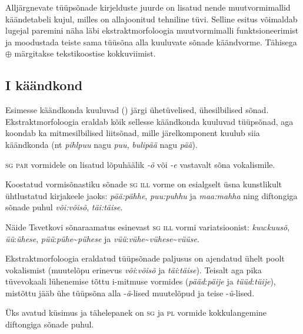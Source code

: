 \documentclass[12pt,a4paper]{article}
\newcommand{\vadja}[1]{\textit{#1}}
\newcommand{\msd}[1]{\textsc{#1}}
\begin{document}

Alljärgnevate tüüpsõnade kirjelduste juurde on lisatud nende muutvormimallid käände\-tabeli kujul, milles on alla\-joonitud tehniline tüvi. Selline esitus võimaldab lugejal paremini näha läbi ekstrakt\-morfoloogia muutvormimalli funktsioneerimist ja moodustada teiste sama tüüsõna alla kuuluvate sõnade käändvorme. Tähisega $\oplus$ märgitakse teksti\-koostise kokku\-viimist.

\subsection{\RN{1} käändkond}

Esimesse käändkonda kuuluvad (\cite[40]{ariste_grammar_1968}) järgi ühetüvelised, ühesilbilised sõnad. Ekstraktmorfoloogia eraldab kõik sellesse käändkonda kuuluvad tüüpsõnad, aga koondab ka mitmesilbilised liitsõnad, mille järelkomponent kuulub siia käändkonda (nt \vadja{pihlpuu} nagu \vadja{puu}, \vadja{bulipää} nagu \vadja{pää}).

\msd{sg par} vormidele on lisatud lõpuhäälik \textit{-õ} või \textit{-e} vastavalt sõna vokalismile.

Koostatud vormisõnastiku sõnade \msd{sg ill} vorme on esialgselt üsna kunstlikult ühtlustatud kirjakeele jaoks: \textit{pää:pähhe}, \textit{puu:puhhu} ja \textit{maa:mahha} ning diftongiga sõnade puhul \textit{või:võisõ}, \textit{täi:täise}.

Näide Tsvetkovi sõnaraamatus esinevast \msd{sg ill} vormi variatsioonist: \vadja{kuu}:\vadja{kuusõ}, \vadja{üü}:\vadja{ühese}, \vadja{püü}:\vadja{pühe}\textasciitilde \vadja{pühese} ja \vadja{vüü}:\vadja{vühe}\textasciitilde \vadja{vühese}\textasciitilde \vadja{vüüse}.

Ekstraktmorfoloogia eraldatud tüüpsõnade paljusus on ajendatud ühelt poolt vokalismist (muutelõpu erinevus \textit{või}:\textit{võisõ} ja \textit{täi}:\textit{täise}). Teisalt aga pika tüve\-vokaali lühenemise tõttu i-mitmuse vormides (\textit{pääd}:\textit{päije} ja \textit{tüüd}:\textit{tüije}), mistõttu jääb ühe tüüpsõna alla -\textit{ä}-lised muutelõpud ja teise -\textit{ü}-lised.

Üks avatud küsimus ja tähelepanek on \msd{sg} ja \msd{pl} vormide kokkulangemine diftongiga sõnade puhul.
\end{document}

